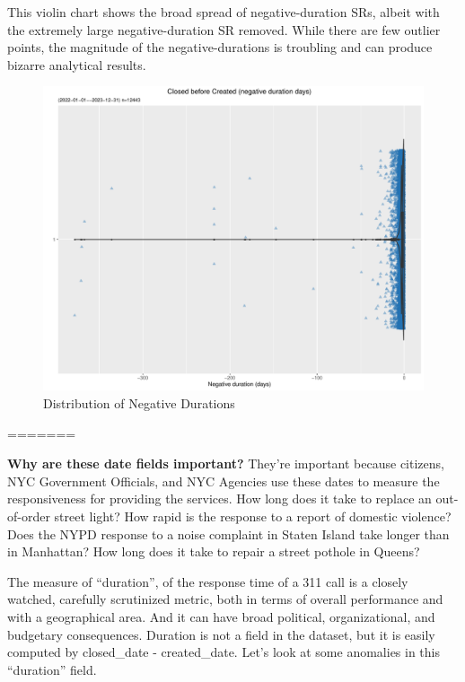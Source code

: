 \documentclass[12pt, titlepage]{article}
\begin{document}
	This violin chart shows the broad spread of negative-duration SRs, albeit with 
	the extremely large negative-duration SR removed. While there are few 
	outlier points, the magnitude of the negative-durations is troubling and can 
	produce bizarre analytical results.
	
	\begin{figure}[tbp]
	 	 \centering
	 	 \includegraphics[width = \textwidth]{negative_duration_SR_violin.pdf}
		 \caption{Distribution of Negative Durations}
		 \label{fig:negative-duration-violin}
	\end{figure}
=======

\textbf{Why are these date fields important?} They're important because citizens, NYC Government Officials, and NYC Agencies use these dates to measure the responsiveness 
for providing the services. How long does it take to replace an out-of-order 
street light? How rapid is the response to a report of domestic violence? 
Does the NYPD response to a noise complaint in Staten Island take longer 
than in Manhattan? How long does it take to repair a street pothole in Queens? 

The measure of ``duration'', of the response time of a 311 call is a closely 
watched, carefully scrutinized metric, both in terms of overall performance 
and with a geographical area. And it can have broad political, organizational, 
and budgetary consequences. Duration is not a field in the dataset, 
but it is easily computed by closed\_date - created\_date. Let's look at 
some anomalies in this ``duration'' field.
\end{document}
